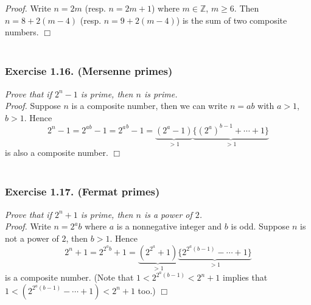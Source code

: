 \documentclass{article}
\begin{document}
\emph{Proof.}
  Write $n = 2m$ (resp. $n = 2m + 1$) where $m \in \mathbb{Z}$, $m \geq 6$.
  Then $n = 8 + 2(m-4)$ (resp. $n = 9 + 2(m-4)$) is the sum of two composite numbers.
$\Box$ \\\\






\subsubsection*{Exercise 1.16. (Mersenne primes)}
\emph{Prove that if $2^n-1$ is prime, then $n$ is prime.} \\



\emph{Proof.}
  Suppose $n$ is a composite number,
  then we can write $n = ab$ with $a > 1$, $b > 1$.
  Hence
  \[
    2^n - 1
    = 2^{ab} - 1
    = {2^a}^b - 1
    = \underbrace{(2^a - 1)}_{> 1}\underbrace{\{(2^a)^{b-1} + \cdots + 1\}}_{> 1}
  \]
  is also a composite number.
$\Box$ \\\\






\subsubsection*{Exercise 1.17. (Fermat primes)}
\emph{Prove that if $2^n+1$ is prime, then $n$ is a power of $2$.} \\



\emph{Proof.}
  Write $n = 2^a b$ where $a$ is a nonnegative integer and $b$ is odd.
  Suppose $n$ is not a power of $2$, then $b > 1$.
  Hence
  \[
    2^n + 1
    = 2^{2^a b} + 1
    = \underbrace{(2^{2^a} + 1)}_{> 1}
        \underbrace{\{2^{2^a(b-1)} - \cdots + 1\}}_{> 1}
  \]
  is a composite number.
  (Note that $1 < 2^{2^a(b-1)} < 2^n + 1$
  implies that $1 < (2^{2^a(b-1)} - \cdots + 1) < 2^n+1$ too.)
$\Box$ \\\\
\end{document}
